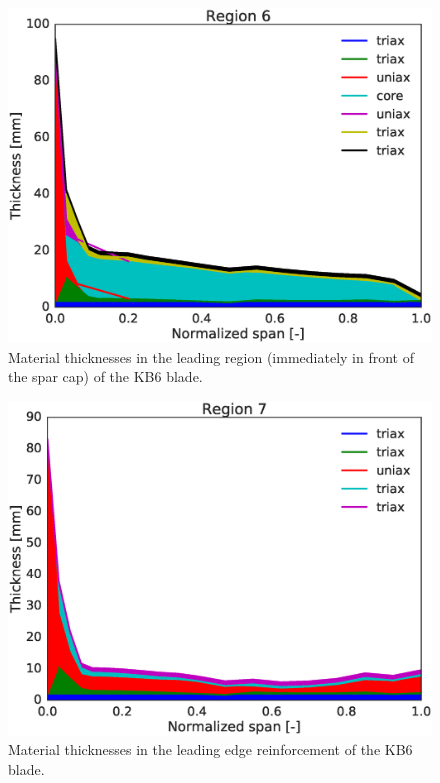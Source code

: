 \begin{figure}[!ht]
\begin{center}
	\includegraphics[width=.85\linewidth]{figures/KB6_laminate_layers_r06.eps}
\end{center}
\caption{Material thicknesses in the leading region (immediately in front of the spar cap) of the KB6 blade.}
\label{fig:KB6matstackr06}
\end{figure}

\begin{figure}[!ht]
\begin{center}
	\includegraphics[width=.85\linewidth]{figures/KB6_laminate_layers_r07.eps}
\end{center}
\caption{Material thicknesses in the leading edge reinforcement of the KB6 blade.}
\label{fig:KB6matstackr07}
\end{figure}



